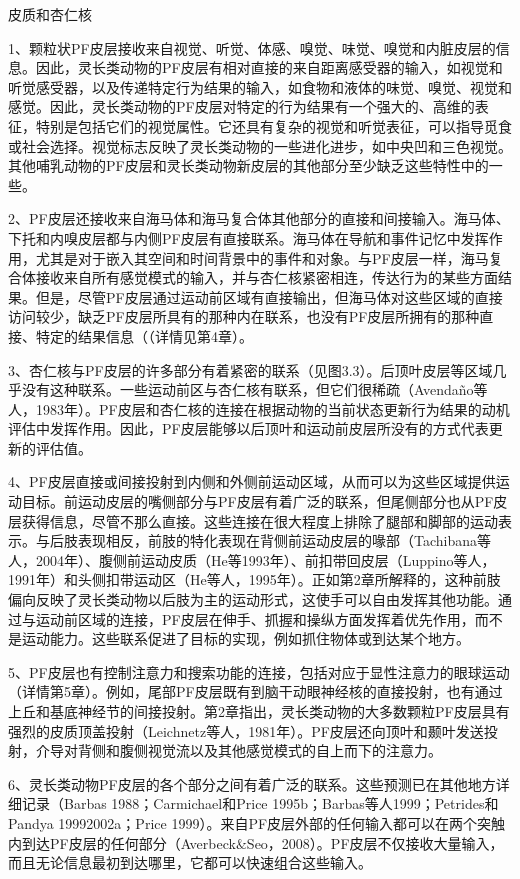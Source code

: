皮质和杏仁核

1、颗粒状PF皮层接收来自视觉、听觉、体感、嗅觉、味觉、嗅觉和内脏皮层的信息。因此，灵长类动物的PF皮层有相对直接的来自距离感受器的输入，如视觉和听觉感受器，以及传递特定行为结果的输入，如食物和液体的味觉、嗅觉、视觉和感觉。因此，灵长类动物的PF皮层对特定的行为结果有一个强大的、高维的表征，特别是包括它们的视觉属性。它还具有复杂的视觉和听觉表征，可以指导觅食或社会选择。视觉标志反映了灵长类动物的一些进化进步，如中央凹和三色视觉。其他哺乳动物的PF皮层和灵长类动物新皮层的其他部分至少缺乏这些特性中的一些。

2、PF皮层还接收来自海马体和海马复合体其他部分的直接和间接输入。海马体、下托和内嗅皮层都与内侧PF皮层有直接联系。海马体在导航和事件记忆中发挥作用，尤其是对于嵌入其空间和时间背景中的事件和对象。与PF皮层一样，海马复合体接收来自所有感觉模式的输入，并与杏仁核紧密相连，传达行为的某些方面结果。但是，尽管PF皮层通过运动前区域有直接输出，但海马体对这些区域的直接访问较少，缺乏PF皮层所具有的那种内在联系，也没有PF皮层所拥有的那种直接、特定的结果信息（（详情见第4章）。

3、杏仁核与PF皮层的许多部分有着紧密的联系（见图3.3）。后顶叶皮层等区域几乎没有这种联系。一些运动前区与杏仁核有联系，但它们很稀疏（Avendaño等人，1983年）。PF皮层和杏仁核的连接在根据动物的当前状态更新行为结果的动机评估中发挥作用。因此，PF皮层能够以后顶叶和运动前皮层所没有的方式代表更新的评估值。

4、PF皮层直接或间接投射到内侧和外侧前运动区域，从而可以为这些区域提供运动目标。前运动皮层的嘴侧部分与PF皮层有着广泛的联系，但尾侧部分也从PF皮层获得信息，尽管不那么直接。这些连接在很大程度上排除了腿部和脚部的运动表示。与后肢表现相反，前肢的特化表现在背侧前运动皮层的喙部（Tachibana等人，2004年）、腹侧前运动皮质（He等1993年）、前扣带回皮层（Luppino等人，1991年）和头侧扣带运动区（He等人，1995年）。正如第2章所解释的，这种前肢偏向反映了灵长类动物以后肢为主的运动形式，这使手可以自由发挥其他功能。通过与运动前区域的连接，PF皮层在伸手、抓握和操纵方面发挥着优先作用，而不是运动能力。这些联系促进了目标的实现，例如抓住物体或到达某个地方。

5、PF皮层也有控制注意力和搜索功能的连接，包括对应于显性注意力的眼球运动（详情第5章）。例如，尾部PF皮层既有到脑干动眼神经核的直接投射，也有通过上丘和基底神经节的间接投射。第2章指出，灵长类动物的大多数颗粒PF皮层具有强烈的皮质顶盖投射（Leichnetz等人，1981年）。PF皮层还向顶叶和颞叶发送投射，介导对背侧和腹侧视觉流以及其他感觉模式的自上而下的注意力。

6、灵长类动物PF皮层的各个部分之间有着广泛的联系。这些预测已在其他地方详细记录（Barbas 1988；Carmichael和Price 1995b；Barbas等人1999；Petrides和Pandya 19992002a；Price 1999）。来自PF皮层外部的任何输入都可以在两个突触内到达PF皮层的任何部分（Averbeck$\&$Seo，2008）。PF皮层不仅接收大量输入，而且无论信息最初到达哪里，它都可以快速组合这些输入。

